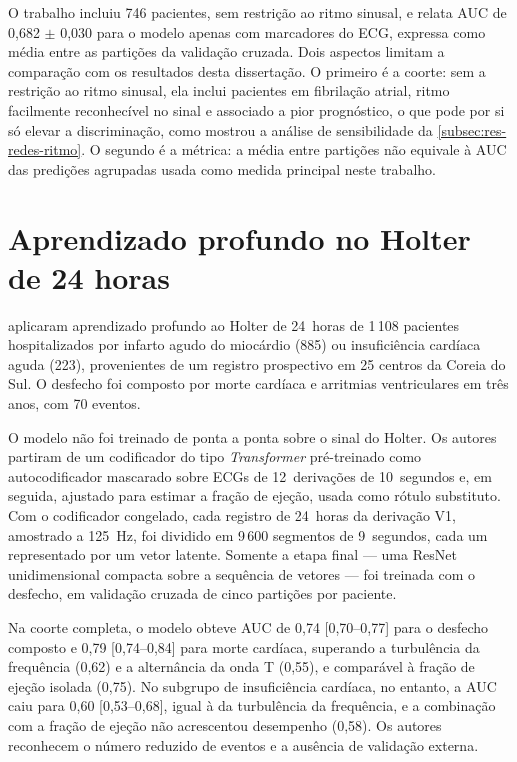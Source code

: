 O trabalho incluiu 746 pacientes, sem restrição ao ritmo sinusal, e relata
\gls{AUC} de 0,682 $\pm$ 0,030 para o modelo apenas com marcadores do
\gls{ECG}, expressa como média entre as partições da validação cruzada.
Dois aspectos limitam a comparação com os resultados desta dissertação. O
primeiro é a coorte: sem a restrição ao ritmo sinusal, ela inclui pacientes
em fibrilação atrial, ritmo facilmente reconhecível no sinal e associado a
pior prognóstico, o que pode por si só elevar a discriminação, como mostrou
a análise de sensibilidade da \autoref{subsec:res-redes-ritmo}. O segundo é a
métrica: a média entre partições não equivale à \gls{AUC} das predições
agrupadas usada como medida principal neste trabalho.

\section{Aprendizado profundo no Holter de 24 horas}
\label{sec:trab-kim}

 aplicaram aprendizado profundo ao Holter de
24~horas de 1\,108 pacientes hospitalizados por infarto agudo do miocárdio
(885) ou insuficiência cardíaca aguda (223), provenientes de um registro
prospectivo em 25 centros da Coreia do Sul. O desfecho foi composto por
morte cardíaca e arritmias ventriculares em três anos, com 70 eventos.

O modelo não foi treinado de ponta a ponta sobre o sinal do Holter. Os
autores partiram de um codificador do tipo \textit{Transformer}
pré-treinado como autocodificador mascarado sobre \gls{ECG}s de
12~derivações de 10~segundos e, em seguida, ajustado para estimar a fração
de ejeção, usada como rótulo substituto. Com o codificador congelado, cada
registro de 24~horas da derivação V1, amostrado a 125~Hz, foi dividido em
9\,600 segmentos de 9~segundos, cada um representado por um vetor latente.
Somente a etapa final --- uma ResNet unidimensional compacta sobre a
sequência de vetores --- foi treinada com o desfecho, em validação cruzada
de cinco partições por paciente.

Na coorte completa, o modelo obteve \gls{AUC} de 0,74 [0,70--0,77] para o
desfecho composto e 0,79 [0,74--0,84] para morte cardíaca, superando a
turbulência da frequência (0,62) e a alternância da onda T (0,55), e
comparável à fração de ejeção isolada (0,75). No subgrupo de insuficiência
cardíaca, no entanto, a \gls{AUC} caiu para 0,60 [0,53--0,68], igual à da
turbulência da frequência, e a combinação com a fração de ejeção não
acrescentou desempenho (0,58). Os autores reconhecem o número reduzido de
eventos e a ausência de validação externa.

